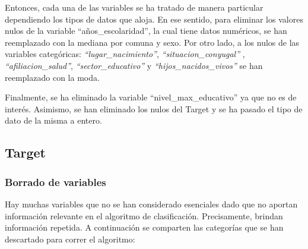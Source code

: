 \documentclass[a4paper]{article}
\begin{document}
        Entonces, cada una de las variables se ha tratado de manera particular dependiendo los tipos de datos que aloja. En ese sentido, para eliminar los valores nulos de la variable ``años\_escolaridad'', la cual tiene datos numéricos, se han reemplazado con la mediana por comuna y sexo. Por otro lado, a los nulos de las variables categóricas: \textit{``lugar\_nacimiento''}, \textit{``situacion\_conyugal''}
        , \textit{``afiliacion\_salud''}, \textit{``sector\_educativo''} y \textit{``hijos\_nacidos\_vivos''}
        se han reemplazado con la moda.
 
        Finalmente, se ha eliminado la variable ``nivel\_max\_educativo'' ya que no es de interés. Asimismo, se han eliminado los nulos del Target y se ha pasado el tipo de dato de la misma a entero. 
        

    \subsection{Target}

        \subsubsection{Borrado de variables}
    
        Hay muchas variables que no se han considerado esenciales dado que no aportan información relevante en el algoritmo de clasificación. Precisamente, brindan información repetida. A continuación se comparten las categorías que se han descartado para correr el algoritmo: 
\end{document}
